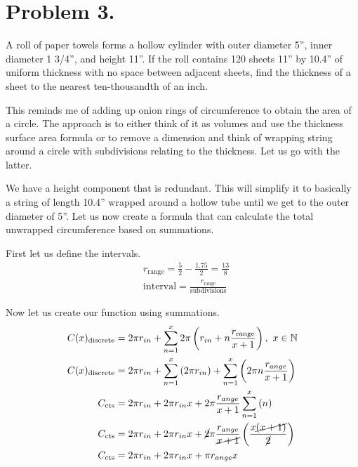 \section{Problem 3.}

A roll of paper towels forms a hollow cylinder with outer diameter 5”, inner diameter 1 3/4”, and height 11”.  
If the roll contains 120 sheets 11” by 10.4” of uniform thickness with no space between adjacent sheets, 
find the thickness of a sheet to the nearest ten-thousandth of an inch.

\begin{solution}
This reminds me of adding up onion rings of circumference to 
obtain the area of a circle. The approach is to either think of it as 
volumes and use the thickness surface area formula or to remove a dimension 
and think of wrapping string around a circle with subdivisions relating to 
the thickness. Let us go with the latter.

We have a height component that is redundant. This will simplify it to basically
a string of length 10.4” wrapped around a hollow tube until we get to the outer diameter
of 5”. Let us now create a formula that can calculate the total unwrapped circumference
based on summations. 

First let us define the intervals.
\begin{align*}
    & r_{\text{range}} = \frac{5}{2} - \frac{1.75}{2} = \frac{13}{8} \\
    & \text{interval}  = \frac{r_{\text{range}}}{\text{subdivisions}}
\end{align*}

Now let us create our function using summations.
\begin{align*}
    C(x)_{\text{discrete}} &= 2\pi r_{in} +\sum_{n=1}^{x}2\pi\left(r_{in}+n\frac{r_{\text{range}}}{x+1}\right), \ x \in \mathbb{N} \\
    C(x)_{\text{discrete}} &= 2\pi r_{in} + \sum_{n=1}^{x}\left(2\pi r_{in}\right)+\sum_{n=1}^{x}\left(2\pi n\frac{r_{ange}}{x+1}\right) \\
    C_{\text{cts}} &= 2\pi r_{in} + 2\pi r_{in}x + 2\pi \frac{r_{ange}}{x+1}\sum_{n=1}^{x}\left(n\right) \\
    C_{\text{cts}} &= 2\pi r_{in} + 2\pi r_{in}x + \cancel{2}\pi \frac{r_{ange}}{\cancel{x+1}}\left(\frac{x\cancel{\left(x+1\right)}}{\cancel{2}}\right) \\
    C_{\text{cts}} &= 2\pi r_{in} + 2\pi r_{in}x + \pi r_{ange} x
\end{align*}


\end{solution}
